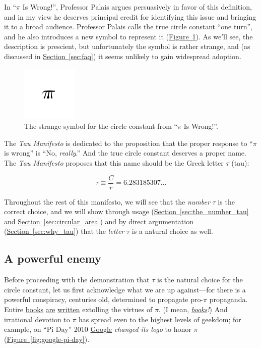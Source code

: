 \documentclass{article}
\begin{document}
In ``$\pi$ Is Wrong!'', Professor Palais argues persuasively in favor of this definition, and in my view he deserves principal credit for identifying this issue and bringing it to a broad audience. Professor Palais calls the true circle constant ``one turn'', and he also introduces a new symbol to represent it (\hyperref[fig:palais-tau]{Figure~}\ref{fig:palais-tau}). As we'll see, the description is prescient, but unfortunately the symbol is rather strange, and (as discussed in \hyperref[sec:faq]{Section~}\ref{sec:faq}) it seems unlikely to gain widespread adoption.

\begin{figure}
\begin{center}
\includegraphics{images/figures/palais-tau.png}
\end{center}
\caption{The strange symbol for the circle constant from ``$\pi$ Is Wrong!''.\label{fig:palais-tau}}
\end{figure}

The \emph{Tau Manifesto} is dedicated to the proposition that the proper response to ``$\pi$ is wrong'' is ``No, \emph{really}.'' And the true circle constant deserves a proper name. The \emph{Tau Manifesto} proposes that this name should be the Greek letter $\tau$ (tau):

\[
  \tau \equiv \frac{C}{r} = 6.283185307\ldots
\]

Throughout the rest of this manifesto, we will see that the \emph{number} $\tau$ is the correct choice, and we will show through usage (\hyperref[sec:the_number_tau]{Section~}\ref{sec:the_number_tau} and \hyperref[sec:circular_area]{Section~}\ref{sec:circular_area}) and by direct argumentation (\hyperref[sec:why_tau]{Section~}\ref{sec:why_tau}) that the \emph{letter} $\tau$ is a natural choice as well.

 \subsection{A powerful enemy} %

Before proceeding with the demonstration that $\tau$ is the natural choice for the circle constant, let us first acknowledge what we are up against---for there is a powerful conspiracy, centuries old, determined to propagate pro-$\pi$ propaganda. Entire \href{http://www.amazon.com/exec/obidos/ISBN=0802713327/parallaxproductiA/}{books} \href{http://www.amazon.com/Pi-Sky-Counting-Thinking-Being/dp/0198539568}{are} \href{http://www.amazon.com/exec/obidos/ISBN=0312381859/parallaxproductiA/}{written} extolling the virtues of $\pi$. (I mean, \href{http://www.amazon.com/exec/obidos/ISBN=0387989463/parallaxproductiA/}{\emph{books}}\emph{!}) And irrational devotion to $\pi$ has spread even to the highest levels of geekdom; for example, on ``Pi Day'' 2010 \href{http://www.google.com/}{Google} \emph{changed its logo} to honor $\pi$  (\hyperref[fig:google-pi-day]{Figure~}\ref{fig:google-pi-day}).  
\end{document}
